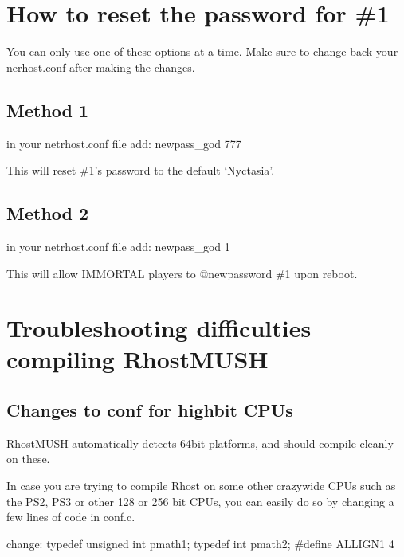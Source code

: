 \documentclass[letterpaper,10pt,english]{sphinxmanual}
\begin{document}
\chapter{How to reset the password for \#1}
\label{\detokenize{25-godpasswd:how-to-reset-the-password-for-1}}\label{\detokenize{25-godpasswd::doc}}
\sphinxAtStartPar
You can only use one of these options at a time. Make sure to change back your nerhost.conf after making the changes.


\section{Method 1}
\label{\detokenize{25-godpasswd:method-1}}
\sphinxAtStartPar
in your netrhost.conf file add:
newpass\_god 777

\sphinxAtStartPar
This will reset \#1’s password to the default ‘Nyctasia’.


\section{Method 2}
\label{\detokenize{25-godpasswd:method-2}}
\sphinxAtStartPar
in your netrhost.conf file add:
newpass\_god 1

\sphinxAtStartPar
This will allow IMMORTAL players to @newpassword \#1 upon reboot.


\chapter{Troubleshooting difficulties compiling RhostMUSH}
\label{\detokenize{26-compileerror:troubleshooting-difficulties-compiling-rhostmush}}\label{\detokenize{26-compileerror::doc}}

\section{Changes to conf for high\sphinxhyphen{}bit CPUs}
\label{\detokenize{26-compileerror:changes-to-conf-for-high-bit-cpus}}
\sphinxAtStartPar
RhostMUSH automatically detects 64\sphinxhyphen{}bit platforms, and should compile
cleanly on these.

\sphinxAtStartPar
In case you are trying to compile Rhost on some other crazy\sphinxhyphen{}wide CPUs
such as the PS2, PS3 or other 128 or 256 bit CPUs, you can easily do
so by changing a few lines of code in conf.c.

\sphinxAtStartPar
change:
typedef unsigned int    pmath1;
typedef int             pmath2;
\#define ALLIGN1 4
\end{document}
